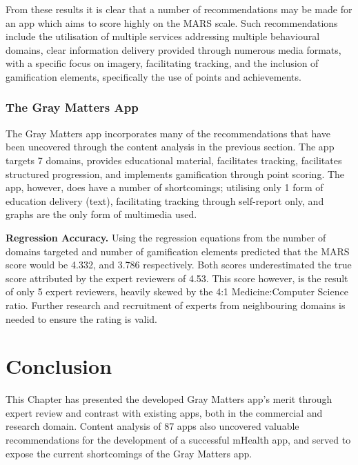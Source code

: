 From these results it is clear that a number of recommendations may be made for an app which aims to score highly on the MARS scale. Such recommendations include the utilisation of multiple services addressing multiple behavioural domains, clear information delivery provided through numerous media formats, with a specific focus on imagery, facilitating tracking, and the inclusion of gamification elements, specifically the use of points and achievements.

\subsubsection{The Gray Matters App}
The Gray Matters app incorporates many of the recommendations that have been uncovered through the content analysis in the previous section. The app targets 7 domains, provides educational material, facilitates tracking, facilitates structured progression, and implements gamification through point scoring. The app, however, does have a number of shortcomings; utilising only 1 form of education delivery (text), facilitating tracking through self-report only, and graphs are the only form of multimedia used.

\textbf{Regression Accuracy.} Using the regression equations from the number of domains targeted and number of gamification elements predicted that the MARS score would be 4.332, and 3.786 respectively.
Both scores underestimated the true score attributed by the expert reviewers of 4.53. This score however, is the result of only 5 expert reviewers, heavily skewed by the 4:1 Medicine:Computer Science ratio. Further research and recruitment of experts from neighbouring domains is needed to ensure the rating is valid.

\section{Conclusion}
This Chapter has presented the developed Gray Matters app's merit through expert review and contrast with existing apps, both in the commercial and research domain. Content analysis of 87 apps also uncovered valuable recommendations for the development of a successful mHealth app, and served to expose the current shortcomings of the Gray Matters app.

